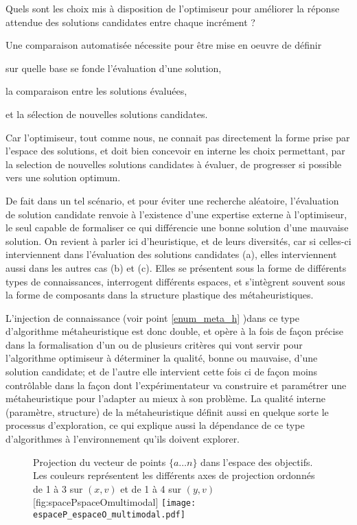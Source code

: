 Quels sont les choix mis à disposition de l'optimiseur pour améliorer la réponse attendue des solutions candidates entre chaque incrément ? \autocite[19]{Weise2011} 

Une comparaison automatisée nécessite pour être mise en oeuvre de définir \begin{enumerate*}[label=(\alph*)]
\item sur quelle base se fonde l'évaluation d'une solution,
\item la comparaison entre les solutions évaluées, 
\item et la sélection de nouvelles solutions candidates.\end{enumerate*} Car l'optimiseur, tout comme nous, ne connait pas directement la forme prise par l'espace des solutions, et doit bien concevoir en interne les choix permettant, par la selection de nouvelles solutions candidates à évaluer, de progresser si possible vers une solution optimum.

De fait dans un tel scénario, et pour éviter une recherche aléatoire, l'évaluation de solution candidate renvoie à l'existence d'une expertise externe à l'optimiseur, le seul capable de formaliser ce qui différencie une bonne solution d'une mauvaise solution. On revient à parler ici d'heuristique, et de leurs diversités, car si celles-ci interviennent dans l'évaluation des solutions candidates (a), elles interviennent aussi dans les autres cas (b) et (c). Elles se présentent sous la forme de différents types de connaissances, interrogent différents espaces, et s'intègrent souvent sous la forme de composants dans la structure plastique des métaheuristiques.

L'injection de connaissance (voir point \ref{enum_meta_h} )dans ce type d'algorithme métaheuristique est donc double, et opère à la fois de façon précise dans la formalisation d'un ou de plusieurs critères qui vont servir pour l'algorithme optimiseur à déterminer la qualité, bonne ou mauvaise, d'une solution candidate; et de l'autre elle intervient cette fois ci de façon moins contrôlable dans la façon dont l'expérimentateur va construire et paramétrer une métaheuristique pour l'adapter au mieux à son problème. La qualité interne (paramètre, structure) de la métaheuristique définit aussi en quelque sorte le processus d'exploration, ce qui explique aussi la dépendance de ce type d'algorithmes à l'environnement qu'ils doivent explorer.

\begin{figure}[ht]
	\begin{sidecaption}[fortoc]{Projection du vecteur de points $\{a \dotsc n\}$ dans l'espace des objectifs. Les couleurs représentent les différents axes de projection ordonnés de 1 à 3 sur $(x,v)$ et de 1 à 4 sur $(y,v)$}[fig:spacePspaceOmultimodal]
	 \centering
	 	\texttt{[image: espaceP\_espaceO\_multimodal.pdf]}
	\end{sidecaption}
\end{figure}

